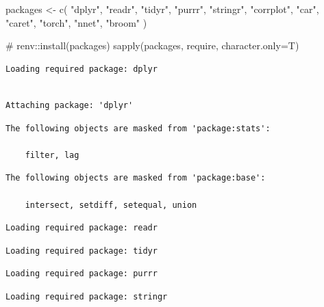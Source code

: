 \documentclass[
  letterpaper,
  DIV=11,
  numbers=noendperiod]{scrartcl}
\newenvironment{Shaded}{\begin{snugshade}}{\end{snugshade}}
\newcommand{\AttributeTok}[1]{\textcolor[rgb]{0.40,0.45,0.13}{#1}}
\newcommand{\CommentTok}[1]{\textcolor[rgb]{0.37,0.37,0.37}{#1}}
\newcommand{\FunctionTok}[1]{\textcolor[rgb]{0.28,0.35,0.67}{#1}}
\newcommand{\NormalTok}[1]{\textcolor[rgb]{0.00,0.23,0.31}{#1}}
\newcommand{\OtherTok}[1]{\textcolor[rgb]{0.00,0.23,0.31}{#1}}
\newcommand{\StringTok}[1]{\textcolor[rgb]{0.13,0.47,0.30}{#1}}
\begin{document}
\begin{Shaded}
\begin{Highlighting}[]
\NormalTok{packages }\OtherTok{\textless{}{-}} \FunctionTok{c}\NormalTok{(}
  \StringTok{"dplyr"}\NormalTok{, }
  \StringTok{"readr"}\NormalTok{, }
  \StringTok{"tidyr"}\NormalTok{, }
  \StringTok{"purrr"}\NormalTok{, }
  \StringTok{"stringr"}\NormalTok{, }
  \StringTok{"corrplot"}\NormalTok{, }
  \StringTok{"car"}\NormalTok{, }
  \StringTok{"caret"}\NormalTok{, }
  \StringTok{"torch"}\NormalTok{, }
  \StringTok{"nnet"}\NormalTok{, }
  \StringTok{"broom"}
\NormalTok{)}

\CommentTok{\# renv::install(packages)}
\FunctionTok{sapply}\NormalTok{(packages, require, }\AttributeTok{character.only=}\NormalTok{T)}
\end{Highlighting}
\end{Shaded}

\begin{verbatim}
Loading required package: dplyr
\end{verbatim}

\begin{verbatim}

Attaching package: 'dplyr'
\end{verbatim}

\begin{verbatim}
The following objects are masked from 'package:stats':

    filter, lag
\end{verbatim}

\begin{verbatim}
The following objects are masked from 'package:base':

    intersect, setdiff, setequal, union
\end{verbatim}

\begin{verbatim}
Loading required package: readr
\end{verbatim}

\begin{verbatim}
Loading required package: tidyr
\end{verbatim}

\begin{verbatim}
Loading required package: purrr
\end{verbatim}

\begin{verbatim}
Loading required package: stringr
\end{verbatim}
\end{document}
